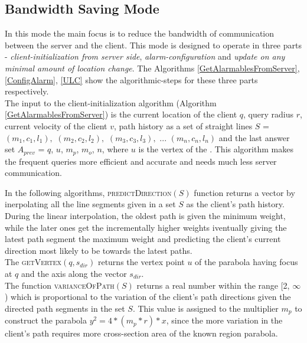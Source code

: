 \documentclass{sig-alternate}
\begin{document}
\subsection{Bandwidth Saving Mode}
In this mode the main focus is to reduce the bandwidth of communication between the server and the client. This mode is designed to operate in three parts - \textit{client-initialization from server side}, \textit{alarm-configuration} and \textit{update on any minimal amount of location change}. The Algorithms \ref{GetAlarmablesFromServer}, \ref{ConfigAlarm}, \ref{ULC} show the algorithmic-steps for these three parts respectively.\\

The input to the client-initialization algorithm (Algorithm \ref{GetAlarmablesFromServer}) is the current location of the client $q$, query radius $r$, current velocity of the client $v$, path history as a set of straight lines $S$ = {$(m_1, c_1, l_1),$ $(m_2, c_2, l_2),$ $(m_3, c_3, l_3),$ ... $(m_n, c_n, l_n)$} and the last answer set $A_{prev}$ = {$q$, $u$, $m_p$, $m_o$, $n$}, where $u$ is the vertex of the . This algorithm makes the frequent queries more efficient and accurate and needs much less server communication.


In the following algorithms, \textsc{predictDirection}$(S)$ function returns a vector by inerpolating all the line segments given in a set $S$ as the client's path history. During the linear interpolation, the oldest path is given the minimum weight, while the later ones get the incrementally higher weights iventually giving the latest path segment the maximum weight and predicting the client's current direction most likely to be towards the latest paths.\\

The \textsc{getVertex}$(q, s_{dir})$ returns the vertex point $u$ of the parabola having focus at $q$ and the axis along the vector $s_{dir}$.\\

The function \textsc{varianceOfPath}$(S)$ returns a real number within the range [2, $\infty$) which is proportional to the variation of the client's path directions given the directed path segments in the set $S$. This value is assigned to the multiplier $m_p$ to construct the parabola $y^2 = 4*(m_p*r)*x$, since the more variation in the client's path requires more cross-section area of the known region parabola.\\
\end{document}

